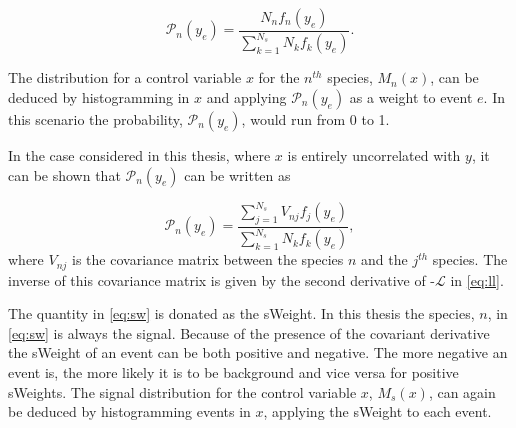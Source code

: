 \begin{equation}
  \mathcal{P}_{n} (y_{e}) = \frac{N_{n}f_{n}(y_{e})}{\sum^{N_{s}}_{k =1} N_{k}f_{k}(y_{e})}.
\end{equation}

The distribution for a control variable $x$ for the $n^{th}$ species, $M_{n}(x)$, can be deduced by histogramming in $x$ and applying $\mathcal{P}_{n} (y_{e})$ as a weight to event $e$. In this scenario the probability, $\mathcal{P}_{n} (y_{e})$, would run from 0 to 1.

In the case considered in this thesis, where $x$ is entirely uncorrelated with $y$, it can be shown that $\mathcal{P}_{n} (y_{e})$ can be written as

\begin{equation}
  \mathcal{P}_{n} (y_{e}) = \frac{\sum^{N_{s}}_{j = 1} V_{nj}f_{j}(y_{e})}{\sum^{N_{s}}_{k =1} N_{k}f_{k}(y_{e})},
  \label{eq:sw}
\end{equation}
where $V_{nj}$ is the covariance matrix between the species $n$ and the $j^{th}$ species. The inverse of this covariance matrix is given by the second derivative of -$\mathcal{L}$ in \autoref{eq:ll}.

The quantity in \autoref{eq:sw} is donated as the sWeight. In this thesis the species, $n$, in \autoref{eq:sw} is always the signal. Because of the presence of the covariant derivative the sWeight of an event can be both positive and negative. The more negative an event is, the more likely it is to be background and vice versa for positive sWeights. The signal distribution for the control variable $x$, $M_{s}(x)$, can again   be deduced by histogramming events in $x$, applying the sWeight to each event. %



